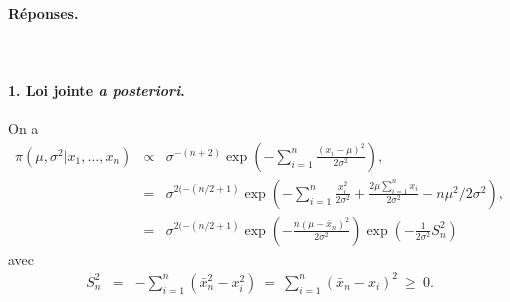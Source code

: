 \paragraph{\bf Réponses.} \\

\paragraph{1. Loi jointe {\it a posteriori}.}
On a 
\begin{eqnarray*}
\pi(\mu,\sigma^2|x_1,\ldots,x_n) & \propto & \sigma^{-(n+2)} \exp\left(-\sum\limits_{i=1}^n \frac{(x_i-\mu)^2}{2\sigma^2}\right), \\
& = & \sigma^{2(-(n/2+1)} \exp \left(-\sum\limits_{i=1}^n \frac{x^2_i}{2\sigma^2} +\frac{2\mu\sum\limits_{i=1}^n x_i}{2\sigma^2} - n\mu^2/2\sigma^2 \right), \\
& = & \sigma^{2(-(n/2+1)} \exp \left( - \frac{n\left(\mu-\bar{x}_n\right)^2}{2\sigma^2}
\right) \exp \left( -\frac{1}{2\sigma^2} S_n^2\right)
\end{eqnarray*}
avec
\begin{eqnarray*}
S^2_n & = & -\sum\limits_{i=1}^n \left(\bar{x}^2_n-x^2_i\right) \ = \  \sum\limits_{i=1}^n \left(\bar{x}_n-x_i\right)^2 \ \geq \ 0.
\end{eqnarray*}
